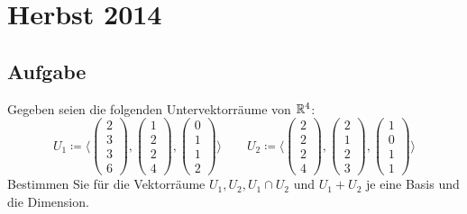 \newpage


\section{Herbst 2014}

\subsection{Aufgabe}
Gegeben seien die folgenden Untervektorräume von \( \mathbb{R}^4 \):
\begin{equation*}
	U_1 \coloneqq \langle \begin{pmatrix}
		2 \\ 3 \\ 3 \\ 6
	\end{pmatrix}, \begin{pmatrix}
		1 \\ 2 \\ 2 \\ 4
	\end{pmatrix}, \begin{pmatrix}
		0 \\ 1 \\ 1 \\ 2
	\end{pmatrix} \rangle \qquad
	U_2 \coloneqq \langle \begin{pmatrix}
		2 \\ 2 \\ 2 \\ 4
	\end{pmatrix}, \begin{pmatrix}
		2 \\ 1 \\ 2 \\ 3
	\end{pmatrix}, \begin{pmatrix}
		1 \\ 0 \\ 1 \\ 1
	\end{pmatrix} \rangle
\end{equation*}
Bestimmen Sie für die Vektorräume \( U_1, U_2, U_1 \cap U_2 \) und \( U_1 + U_2 \) je eine Basis und die Dimension.

